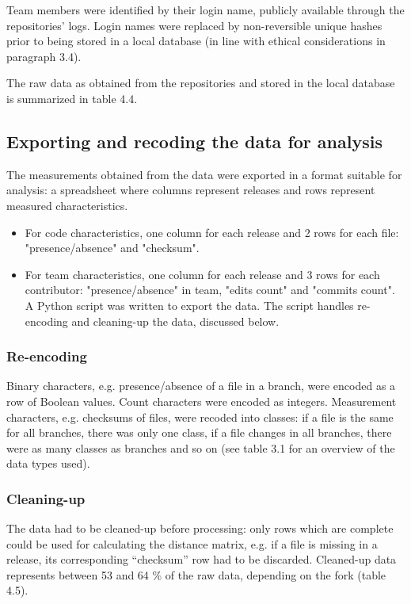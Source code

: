 Team members were identified by their login name, publicly available through the repositories’ logs. Login names were replaced by non-reversible unique hashes prior to being stored in a local database (in line with ethical considerations in paragraph 3.4).

The raw data as obtained from the repositories and stored in the local database is summarized in table 4.4.

\subsection{Exporting and recoding the data for analysis}
The measurements obtained from the data were exported in a format suitable for analysis: a spreadsheet where columns represent releases and rows represent measured characteristics.

\begin{itemize}
\item{For code characteristics, one column for each release and 2 rows for each file: "presence/absence" and "checksum".}
\item{For team characteristics, one column for each release and 3 rows for each contributor: "presence/absence" in team, "edits count" and "commits count".
A Python script was written to export the data. The script handles re-encoding and cleaning-up the data, discussed below.}
\end{itemize}

\subsubsection{Re-encoding}
Binary characters, e.g. presence/absence of a file in a branch, were encoded as a row of Boolean values. Count characters were encoded as integers. Measurement characters, e.g. checksums of files, were recoded into classes: if a file is the same for all branches, there was only one class, if a file changes in all branches, there were as many classes as branches and so on (see table 3.1 for an overview of the data types used).

\subsubsection{Cleaning-up}
The data had to be cleaned-up before processing: only rows which are complete could be used for calculating the distance matrix, e.g. if a file is missing in a release, its corresponding “checksum” row had to be discarded. Cleaned-up data represents between 53 and 64 \% of the raw data, depending on the fork (table 4.5).

